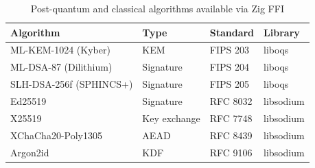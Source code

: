 \documentclass[11pt,a4paper]{article}
\begin{document}
\begin{table}[htbp]
\centering
\caption{Post-quantum and classical algorithms available via Zig FFI}
\begin{tabular}{@{}llll@{}}
\toprule
\textbf{Algorithm} & \textbf{Type} & \textbf{Standard} & \textbf{Library} \\
\midrule
ML-KEM-1024 (Kyber) & KEM & FIPS 203 & liboqs \\
ML-DSA-87 (Dilithium) & Signature & FIPS 204 & liboqs \\
SLH-DSA-256f (SPHINCS+) & Signature & FIPS 205 & liboqs \\
Ed25519 & Signature & RFC 8032 & libsodium \\
X25519 & Key exchange & RFC 7748 & libsodium \\
XChaCha20-Poly1305 & AEAD & RFC 8439 & libsodium \\
Argon2id & KDF & RFC 9106 & libsodium \\
\bottomrule
\end{tabular}
\end{table}
\end{document}
